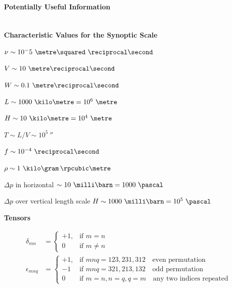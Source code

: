 \documentclass[11pt]{article}
\begin{document}
\newpage
\paragraph{Potentially Useful Information}~\\

\textbf{Characteristic Values for the Synoptic Scale}
\begin{itemize}
\begin{minipage}{0.35\linewidth}
\item $\nu \sim 10^-5\ \metre\squared\ \reciprocal\second$
\item $V \sim 10\ \metre\reciprocal\second$
\item $W \sim 0.1\ \metre\reciprocal\second$
\item $L \sim 1000\ \kilo\metre = 10^6\ \metre$
\item $H \sim 10\ \kilo\metre = 10^4\ \metre$
\end{minipage}
\begin{minipage}{0.65\linewidth}
\item $T \sim L/V \sim 10^5\ \second$
\item $f \sim 10^{-4}\ \reciprocal\second$
\item $\rho \sim 1\ \kilo\gram \, \rpcubic\metre$
\item $\Delta p$ in horizontal $\sim 10\ \milli\barn = 1000\ \pascal$
\item $\Delta p$ over vertical length scale $H \sim 1000\ \milli\barn = 10^5\ \pascal$
\end{minipage}
\end{itemize}

\textbf{Tensors}

\begin{align*}
\delta_{mn} &= 
	\begin{cases}
    +1, & \text{if } m=n\\
    0   & \text{if } m \neq n
	\end{cases}\\
	\epsilon_{mnq} &= 
	\begin{cases}
    +1, & \text{if } mnq = 123, 231, 312\quad \text{even permutation}\\
    -1  & \text{if } mnq = 321, 213, 132\quad \text{odd permutation}\\
    0   & \text{if } m=n, n=q, q=m\quad \text{any two indices repeated}
	\end{cases}
\end{align*}
	
	
	
	
	
	
	
	
	
	
	
	
	
\end{document}
